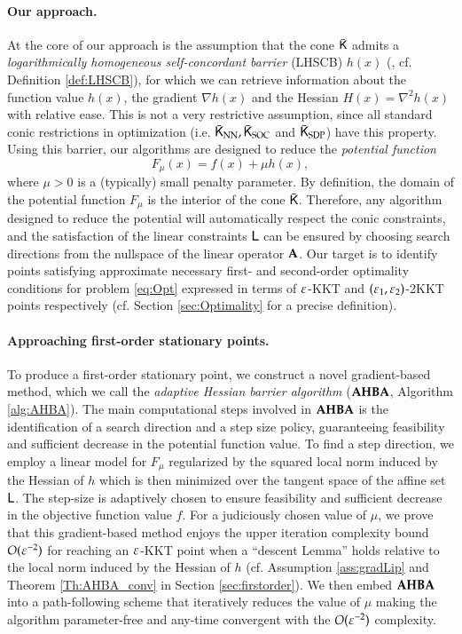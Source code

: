 \paragraph{Our approach.}
At the core of our approach is the assumption that the cone $\bar{\mathsf{K}}$ admits a \emph{logarithmically homogeneous self-concordant barrier} (LHSCB) $h(x)$ (\cite{NesNem94}, cf. Definition \ref{def:LHSCB}), for which we can retrieve information about the function value $h(x)$, the gradient $\nabla h(x)$ and the Hessian $H(x)=\nabla^{2}h(x)$ with relative ease. This is not a very restrictive assumption, since all standard conic restrictions in optimization (i.e. $\bar{\mathsf{K}}_{\text{NN}},\bar{\mathsf{K}}_{\text{SOC}}$ and $\bar{\mathsf{K}}_{\text{SDP}}$) have this property. Using this barrier, our algorithms are designed to reduce the \emph{potential function}
\begin{equation}\label{eq:potential}
F_{\mu}(x)=f(x)+\mu h(x),
\end{equation}
where $\mu>0$ is a (typically) small penalty parameter. By definition, the domain of the potential function $F_{\mu}$ is the interior of the cone $\bar{\mathsf{K}}$. Therefore, any algorithm designed to reduce the potential will automatically respect the conic constraints, and the satisfaction of the linear constraints $\mathsf{L}$ can be ensured by choosing search directions from the nullspace of the linear operator ${\mathbf A}$. Our target is to identify points satisfying approximate necessary first- and second-order optimality conditions for problem \eqref{eq:Opt} expressed in terms of $\varepsilon$-KKT and $(\varepsilon_1,\varepsilon_2)$-2KKT points respectively (cf. Section \ref{sec:Optimality} for a precise definition).

\paragraph{Approaching first-order stationary points.}
To produce a first-order stationary point, we construct a novel gradient-based method, which we call the \emph{adaptive Hessian barrier algorithm} ($\operatorname{\mathbf{AHBA}}$, Algorithm \ref{alg:AHBA}). The main computational steps involved in $\operatorname{\mathbf{AHBA}}$ is the identification of a search direction and a step size policy, guaranteeing feasibility and sufficient decrease in the potential function value. To find a step direction, we employ a linear model for $F_{\mu}$ regularized by the squared local norm induced by the Hessian of $h$ which is then minimized over the tangent space of the affine set $\mathsf{L}$. The step-size is adaptively chosen to ensure feasibility and sufficient decrease in the objective function value $f$. For a judiciously chosen value of $\mu$, we prove that this gradient-based method enjoys the upper iteration complexity bound $O(\varepsilon^{-2})$ for reaching an $\varepsilon$-KKT point when a ``descent Lemma'' holds relative to the local norm induced by the Hessian of $h$ (cf. Assumption \ref{ass:gradLip} and Theorem \ref{Th:AHBA_conv} in Section \ref{sec:firstorder}). We then embed $\operatorname{\mathbf{AHBA}}$ into a path-following scheme that iteratively reduces the value of $\mu$ making the algorithm parameter-free and any-time convergent with the $O(\varepsilon^{-2})$ complexity.

